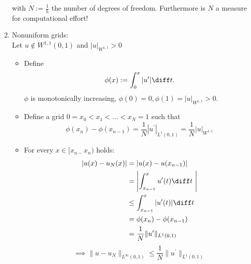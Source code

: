 \begin{example}
\begin{enumerate}[label = \Roman*)]
			with $N := \frac{1}{h}$ the number of degrees of freedom. Furthermore is $N$ a measure for computational effort!
		\item Nonuniform grids:\\
			Let $u \not \in W^{1,1}(0,1)$ and $|u|_{W^{1,1}}>0$
			\begin{itemize}
				\item Define
					\begin{equation*}
						\phi(x) := \int_{0}^x |u^\prime | \diff t.
					\end{equation*}
					$\phi$ is monotonically increasing, $\phi(0)=0,\phi(1)=|u|_{W^{1,1}} > 0$.
				\item Define a grid $0 = x_{0} < x_{1}< \dots < x_{N} = 1$ such that
					\begin{equation*}
						\phi(x_{n}) - \phi(x_{n-1}) = \frac{1}{N} |u^\prime|_{L^1(0,1)}= \frac{1}{N} |u|_{W^{1,1}}
					\end{equation*}
				\item For every $x \in [x_{n-}x_{n})$ holds:
					\begin{align*}
						|u(x)-u_{N}(x)|&= |u(x)-u(x_{n-1})|\\
									   &= \left| \int_{x_{n-1}}^{x} u^\prime(t) \diff t\ \right|\\
									   &\leq \int_{x_{n-1}}^{x} |u^\prime(t)| \diff t\\\
									   &= \phi(x_{n}) - \phi(x_{n-1}) \\
									   &= \frac{1}{N} \|u^\prime\|_{L^{1}(0,1)}						  
					\end{align*}
					\begin{equation*}
						\implies \|u - u_{N}\|_{L^{\infty}(0,1)} \leq \frac{1}{N} \|u^\prime\|_{L^{1}(0,1)}
					\end{equation*}
			\end{itemize}
	\end{enumerate}
\end{example}
